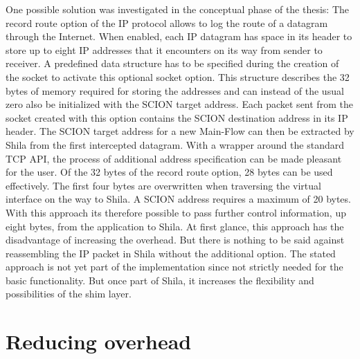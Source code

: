 One possible solution was investigated in the conceptual phase of the thesis: The record route option of the IP protocol allows to log the route of a datagram through the Internet. When enabled, each IP datagram has space in its header to store up to eight IP addresses that it encounters on its way from sender to receiver. A predefined data structure has to be specified during the creation of the socket to activate this optional socket option. This structure describes the 32 bytes of memory required for storing the addresses and can instead of the usual zero also be initialized with the SCION target address. Each packet sent from the socket created with this option contains the SCION destination address in its IP header. The SCION target address for a new Main-Flow can then be extracted by Shila from the first intercepted datagram. With a wrapper around the standard TCP API, the process of additional address specification can be made pleasant for the user. Of the 32 bytes of the record route option, 28 bytes can be used effectively. The first four bytes are overwritten when traversing the virtual interface on the way to Shila. A SCION address requires a maximum of 20 bytes. With this approach its therefore possible to pass further control information, up eight bytes, from the application to Shila. At first glance, this approach has the disadvantage of increasing the overhead. But there is nothing to be said against reassembling the IP packet in Shila without the additional option. The stated approach is not yet part of the implementation since not strictly needed for the basic functionality. But once part of Shila, it increases the flexibility and possibilities of the shim layer.

\section*{Reducing overhead}

